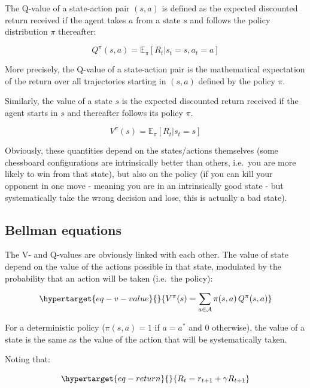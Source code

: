 \documentclass[
  letterpaper,
  DIV=11,
  numbers=noendperiod]{scrreprt}
\begin{document}
The Q-value of a state-action pair \((s, a)\) is defined as the expected
discounted return received if the agent takes \(a\) from a state \(s\)
and follows the policy distribution \(\pi\) thereafter:

\[
    Q^{\pi}(s, a) = \mathbb{E}_{\pi}[R_t | s_t = s, a_t=a]
\]

More precisely, the Q-value of a state-action pair is the mathematical
expectation of the return over all trajectories starting in \((s, a)\)
defined by the policy \(\pi\).

Similarly, the value of a state \(s\) is the expected discounted return
received if the agent starts in \(s\) and thereafter follows its policy
\(\pi\).

\[
    V^{\pi}(s) = \mathbb{E}_{\pi}[R_t | s_t = s]
\]

Obviously, these quantities depend on the states/actions themselves
(some chessboard configurations are intrinsically better than others,
i.e.~you are more likely to win from that state), but also on the policy
(if you can kill your opponent in one move - meaning you are in an
intrinsically good state - but systematically take the wrong decision
and lose, this is actually a bad state).

\hypertarget{bellman-equations}{%
\subsection{Bellman equations}\label{bellman-equations}}

The V- and Q-values are obviously linked with each other. The value of
state depend on the value of the actions possible in that state,
modulated by the probability that an action will be taken (i.e.~the
policy):

\begin{equation}\protect\hypertarget{eq-v-value}{}{
    V^{\pi}(s) = \sum_{a \in \mathcal{A}} \pi(s, a) \, Q^\pi(s,a)
}\label{eq-v-value}\end{equation}

For a deterministic policy (\(\pi(s, a) = 1\) if \(a=a^*\) and \(0\)
otherwise), the value of a state is the same as the value of the action
that will be systematically taken.

Noting that:

\begin{equation}\protect\hypertarget{eq-return}{}{
    R_t = r_{t+1} + \gamma R_{t+1}
}\label{eq-return}\end{equation}
\end{document}
